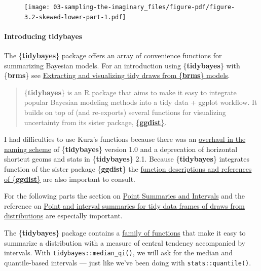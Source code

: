 \documentclass[
  letterpaper,
  DIV=11,
  numbers=noendperiod]{scrreprt}
\let\oldparagraph\paragraph
\renewcommand{\paragraph}[1]{\oldparagraph{#1}\mbox{}}
\begin{document}
\begin{figure}[H]

{\centering \texttt{[image: 03-sampling-the-imaginary\_files/figure-pdf/figure-3.2-skewed-lower-part-1.pdf]}

}

\end{figure}

\hypertarget{introducing-tidybayes}{%
\paragraph{Introducing tidybayes}\label{introducing-tidybayes}}

The \href{https://mjskay.github.io/tidybayes/}{\{\textbf{tidybayes}\}}
package offers an array of convenience functions for summarizing
Bayesian models. For an introduction using \{\textbf{tidybayes}\} with
\{\textbf{brms}\} see
\href{https://mjskay.github.io/tidybayes/articles/tidy-brms.html}{Extracting
and visualizing tidy draws from \{\textbf{brms}\} models}.

\begin{quote}
\{\textbf{tidybayes}\} is an R package that aims to make it easy to
integrate popular Bayesian modeling methods into a tidy data + ggplot
workflow. It builds on top of (and re-exports) several functions for
visualizing uncertainty from its sister package,
\href{https://mjskay.github.io/ggdist/}{\{\textbf{ggdist}\}}.
\end{quote}

I had difficulties to use Kurz's functions because there was an
\href{https://mjskay.github.io/tidybayes/reference/tidybayes-deprecated.html}{overhaul
in the naming scheme} of \{\textbf{tidybayes}\} version 1.0 and a
deprecation of horizontal shortcut geoms and stats in
\{\textbf{tidybayes}\} 2.1. Because \{\textbf{tidybayes}\} integrates
function of the sister package \{\textbf{ggdist}\} the
\href{https://mjskay.github.io/ggdist/reference/index.html}{function
descriptions and references of \{\textbf{ggdist}\}} are also important
to consult.

For the following parts the section on
\href{https://mjskay.github.io/tidybayes/articles/tidy-brms.html\#point-summaries-and-intervals}{Point
Summaries and Intervals} and the reference on
\href{https://mjskay.github.io/ggdist/reference/point_interval.html}{Point
and interval summaries for tidy data frames of draws from distributions}
are especially important.

The \{\textbf{tidybayes}\} package contains a
\href{https://mjskay.github.io/tidybayes/articles/tidy-brms.html\#point-summaries-and-intervals}{family
of functions} that make it easy to summarize a distribution with a
measure of central tendency accompanied by intervals. With
\texttt{tidybayes::median\_qi()}, we will ask for the median and
quantile-based intervals --- just like we've been doing with
\texttt{stats::quantile()}.
\end{document}
